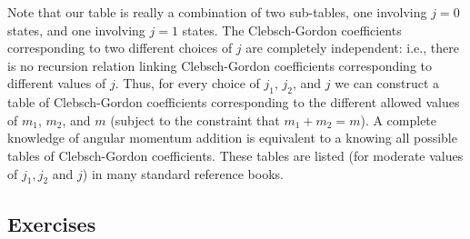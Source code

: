 Note that our table is really a combination of two sub-tables, one involving
$j=0$ states, and one involving $j=1$ states. The Clebsch-Gordon coefficients
corresponding to two different choices of $j$ are completely independent:
{\rm i.e.}, there is no recursion relation linking Clebsch-Gordon coefficients
corresponding to different values of $j$. Thus, for every choice of $j_1$, $j_2$,
and $j$ we can construct a table of Clebsch-Gordon coefficients corresponding
to the different allowed values of $m_1$, $m_2$, and $m$ (subject to the
constraint that $m_1+m_2=m$). A complete knowledge of angular momentum addition
is equivalent to a knowing all possible tables of Clebsch-Gordon coefficients.
These tables are listed (for moderate values of
$j_1, j_2$ and $j$) in many standard reference books. 

\subsection*{Exercises}
